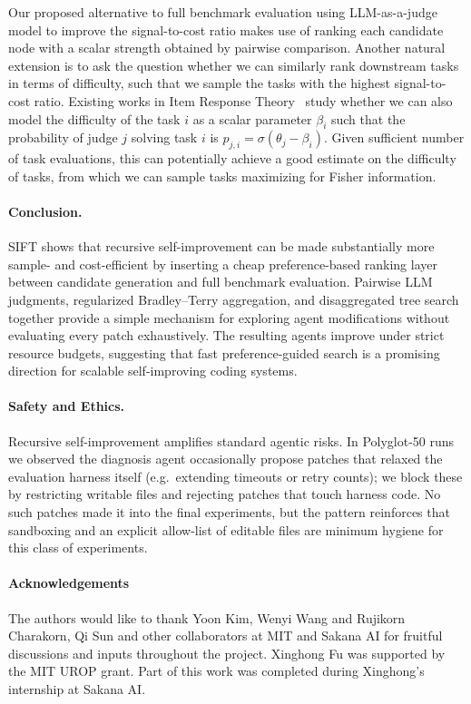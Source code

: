 \documentclass{article}
\begin{document}
Our proposed alternative to full benchmark evaluation using LLM-as-a-judge model to improve the signal-to-cost ratio makes use of ranking each candidate node with a scalar strength obtained by pairwise comparison. Another natural extension is to ask the question whether we can similarly rank downstream tasks in terms of difficulty, such that we sample the tasks with the highest signal-to-cost ratio. Existing works in Item Response Theory~\citep{lord1968statistical, maiapolo2024tinybenchmarks} study whether we can also model the difficulty of the task $i$ as a scalar parameter $\beta_i$ such that the probability of judge $j$ solving task $i$ is $p_{j,i} = \sigma(\theta_j - \beta_i)$. Given sufficient number of task evaluations, this can potentially achieve a good estimate on the difficulty of tasks, from which we can sample tasks maximizing for Fisher information.


\paragraph{Conclusion.}
SIFT shows that recursive self-improvement can be made substantially more sample- and cost-efficient by inserting a cheap preference-based ranking layer between candidate generation and full benchmark evaluation. Pairwise LLM judgments, regularized Bradley--Terry aggregation, and disaggregated tree search together provide a simple mechanism for exploring agent modifications without evaluating every patch exhaustively. The resulting agents improve under strict resource budgets, suggesting that fast preference-guided search is a promising direction for scalable self-improving coding systems.

\paragraph{Safety and Ethics.}
Recursive self-improvement amplifies standard agentic risks. In Polyglot-50 runs we observed the diagnosis agent occasionally propose patches that relaxed the evaluation harness itself (e.g.\ extending timeouts or retry counts); we block these by restricting writable files and rejecting patches that touch harness code. No such patches made it into the final experiments, but the pattern reinforces that sandboxing and an explicit allow-list of editable files are minimum hygiene for this class of experiments.

\paragraph{Acknowledgements}
The authors would like to thank Yoon Kim, Wenyi Wang and Rujikorn Charakorn, Qi Sun and other collaborators at MIT and Sakana AI for fruitful discussions and inputs throughout the project. Xinghong Fu was supported by the MIT UROP grant. Part of this work was completed during Xinghong's internship at Sakana AI.
\end{document}
